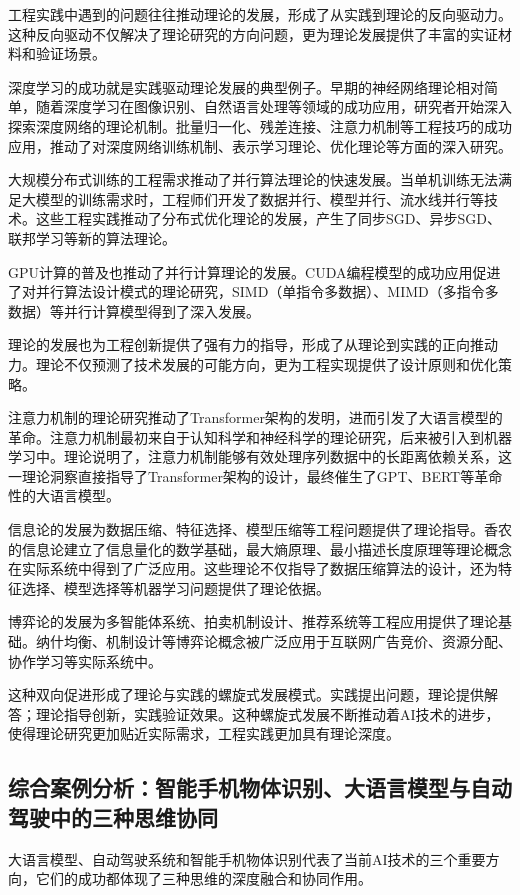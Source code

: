 工程实践中遇到的问题往往推动理论的发展，形成了从实践到理论的反向驱动力。这种反向驱动不仅解决了理论研究的方向问题，更为理论发展提供了丰富的实证材料和验证场景。

深度学习的成功就是实践驱动理论发展的典型例子。早期的神经网络理论相对简单，随着深度学习在图像识别、自然语言处理等领域的成功应用，研究者开始深入探索深度网络的理论机制。批量归一化、残差连接、注意力机制等工程技巧的成功应用，推动了对深度网络训练机制、表示学习理论、优化理论等方面的深入研究。

大规模分布式训练的工程需求推动了并行算法理论的快速发展。当单机训练无法满足大模型的训练需求时，工程师们开发了数据并行、模型并行、流水线并行等技术。这些工程实践推动了分布式优化理论的发展，产生了同步SGD、异步SGD、联邦学习等新的算法理论。

GPU计算的普及也推动了并行计算理论的发展。CUDA编程模型的成功应用促进了对并行算法设计模式的理论研究，SIMD（单指令多数据）、MIMD（多指令多数据）等并行计算模型得到了深入发展。

理论的发展也为工程创新提供了强有力的指导，形成了从理论到实践的正向推动力。理论不仅预测了技术发展的可能方向，更为工程实现提供了设计原则和优化策略。

注意力机制的理论研究推动了Transformer架构的发明，进而引发了大语言模型的革命。注意力机制最初来自于认知科学和神经科学的理论研究，后来被引入到机器学习中。理论说明了，注意力机制能够有效处理序列数据中的长距离依赖关系，这一理论洞察直接指导了Transformer架构的设计，最终催生了GPT、BERT等革命性的大语言模型。

信息论的发展为数据压缩、特征选择、模型压缩等工程问题提供了理论指导。香农的信息论建立了信息量化的数学基础，最大熵原理、最小描述长度原理等理论概念在实际系统中得到了广泛应用。这些理论不仅指导了数据压缩算法的设计，还为特征选择、模型选择等机器学习问题提供了理论依据。

博弈论的发展为多智能体系统、拍卖机制设计、推荐系统等工程应用提供了理论基础。纳什均衡、机制设计等博弈论概念被广泛应用于互联网广告竞价、资源分配、协作学习等实际系统中。

这种双向促进形成了理论与实践的螺旋式发展模式。实践提出问题，理论提供解答；理论指导创新，实践验证效果。这种螺旋式发展不断推动着AI技术的进步，使得理论研究更加贴近实际需求，工程实践更加具有理论深度。

\subsection{综合案例分析：智能手机物体识别、大语言模型与自动驾驶中的三种思维协同}
大语言模型、自动驾驶系统和智能手机物体识别代表了当前AI技术的三个重要方向，它们的成功都体现了三种思维的深度融合和协同作用。

